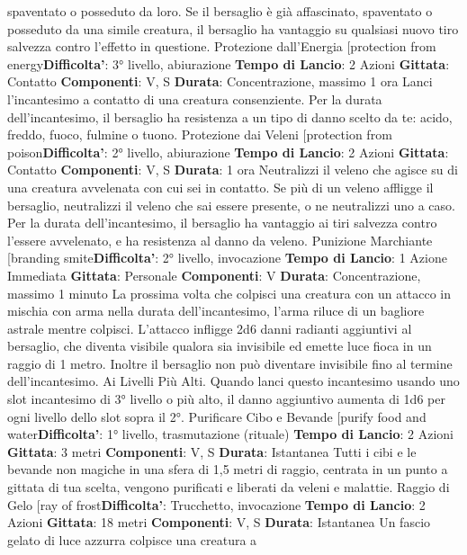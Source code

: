\begin{multicols}{2}
spaventato o posseduto da loro. Se il bersaglio è già
affascinato, spaventato o posseduto da una simile
creatura, il bersaglio ha vantaggio su qualsiasi nuovo
tiro salvezza contro l’effetto in questione.
Protezione dall’Energia
[protection from energy\textbf{Difficolta'}:
3° livello, abiurazione
\textbf{Tempo di Lancio}: 2 Azioni
\textbf{Gittata}: Contatto
\textbf{Componenti}: V, S
\textbf{Durata}: Concentrazione, massimo 1 ora
Lanci l’incantesimo a contatto di una creatura
consenziente. Per la durata dell’incantesimo, il
bersaglio ha resistenza a un tipo di danno scelto da te:
acido, freddo, fuoco, fulmine o tuono.
Protezione dai Veleni
[protection from poison\textbf{Difficolta'}:
2° livello, abiurazione
\textbf{Tempo di Lancio}: 2 Azioni
\textbf{Gittata}: Contatto
\textbf{Componenti}: V, S
\textbf{Durata}: 1 ora
Neutralizzi il veleno che agisce su di una creatura
avvelenata con cui sei in contatto. Se più di un veleno
affligge il bersaglio, neutralizzi il veleno che sai essere
presente, o ne neutralizzi uno a caso.
Per la durata dell’incantesimo, il bersaglio ha vantaggio
ai tiri salvezza contro l’essere avvelenato, e ha
resistenza al danno da veleno.
Punizione Marchiante
[branding smite\textbf{Difficolta'}:
2° livello, invocazione
\textbf{Tempo di Lancio}: 1 Azione Immediata
\textbf{Gittata}: Personale
\textbf{Componenti}: V
\textbf{Durata}: Concentrazione, massimo 1 minuto
La prossima volta che colpisci una creatura con un
attacco in mischia con arma nella durata
dell’incantesimo, l’arma riluce di un bagliore astrale
mentre colpisci. L’attacco infligge 2d6 danni radianti
aggiuntivi al bersaglio, che diventa visibile qualora sia
invisibile ed emette luce fioca in un raggio di 1 metro.
Inoltre il bersaglio non può diventare invisibile fino al
termine dell’incantesimo.
Ai Livelli Più Alti. Quando lanci questo incantesimo
usando uno slot incantesimo di 3° livello o più alto, il
danno aggiuntivo aumenta di 1d6 per ogni livello dello
slot sopra il 2°.
Purificare Cibo e Bevande
[purify food and water\textbf{Difficolta'}:
1° livello, trasmutazione (rituale)
\textbf{Tempo di Lancio}: 2 Azioni
\textbf{Gittata}: 3 metri
\textbf{Componenti}: V, S
\textbf{Durata}: Istantanea
Tutti i cibi e le bevande non magiche in una sfera di 1,5
metri di raggio, centrata in un punto a gittata di tua
scelta, vengono purificati e liberati da veleni e malattie.
Raggio di Gelo
[ray of frost\textbf{Difficolta'}:
Trucchetto, invocazione
\textbf{Tempo di Lancio}: 2 Azioni
\textbf{Gittata}: 18 metri
\textbf{Componenti}: V, S
\textbf{Durata}: Istantanea
Un fascio gelato di luce azzurra colpisce una creatura a

\end{multicols}
